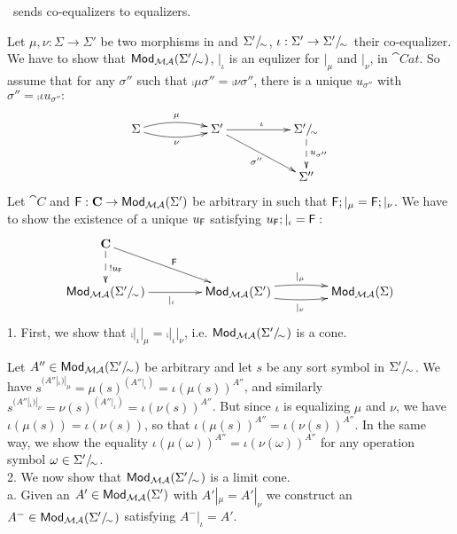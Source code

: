 \begin{lemma}\label{le:coequtoequ}
\Mod\ sends co-equalizers to equalizers.
\end{lemma}
\begin{PROOF}
Let $\mu,\nu:\Sigma \to \Sigma'$ be two morphisms in  and  $\Sigma'/\!_{\sim_{}}$,
	$\iota: \Sigma' \to \Sigma'/\!_{\sim_{}}$ their
	co-equalizer. 
We have to show that
	${\sf {Mod}}_{{\mathcal{MA}}}(\Sigma'/\!_{\sim_{}})$, $|_{\iota}$
	is an equlizer for $|_{\mu}$ and $|_{\nu}$, in $\cat{Cat}$.
So assume that for any $\sigma''$ such that
$\comp\mu{\sigma''}=\comp\nu{\sigma''}$, there is a unique $u_{\sigma''}$
with $\sigma''=\comp{\iota}{u_{\sigma''}}:$
\[\xymatrix@C=1.8cm{ %
\Sigma \ar@/_/[r]_{\nu} \ar@/^/[r]^{\mu}
	& {\Sigma'} \ar[r]^{\iota} \ar[dr]_{\sigma''}
	& \qu{\Sigma'}{\kernel{}} \ar@{-->}[d]^{u_{\sigma''}} \\
&& \Sigma''
}
\]
Let $\cat{C}$ and ${\sf {F}}:{\bf C}\to{\sf {Mod}}_{{\mathcal{MA}}}(\Sigma')$ be arbitrary
in  such that ${\sf {F}};|_\mu={\sf {F}};|_\nu$. We have to show the
existence of a unique $u_{{\sf {F}}}$ satisfying
$u_{{\sf {F}}};|_{\iota}={\sf {F}}:$
\[\xymatrix@C=1.5cm{
\label{di:modequlizer}
	\cat{C} \ar[dr]^{\fu{F}}  \ar@{-->}[d]^{!u_{\fu{F}}} \\
	\Mod_{\inst{MA}}(\qu{\Sigma'}{\kernel{}}) \ar[r]_{|_{\iota}}
		& \Mod_{\inst{MA}}(\Sigma') \ar@/_/[r]_{|_\nu} \ar@/^/[r]^{|_\mu}
			& \Mod_{\inst{MA}}(\Sigma) 	\\
							}
\]
1. First, we show that $\comp{|_\iota}{|_\mu}=\comp{|_\iota}{|_\nu}$, i.e. ${\sf {Mod}}_{{\mathcal{MA}}}(\Sigma'/\!_{\sim_{}})$ is a cone.

Let $A''\in{\sf {Mod}}_{{\mathcal{MA}}}(\Sigma'/\!_{\sim_{}})$ be arbitrary and let $s$ be any
sort symbol in $\Sigma'/\!_{\sim_{}}$. We have $s^{(A''|_{\iota})|_{\mu}}
= \mu(s)^{(A''|_{\iota})}= \iota(\mu(s))^{A''}$, and similarly $s^{(A''|_{\iota})|_{\nu}}
= \nu(s)^{(A''|_{\iota})}= \iota(\nu(s))^{A''}$. But since $\iota$ is
equalizing $\mu$ and $\nu$, we have $ \iota(\mu(s))= \iota(\nu(s))$, so that
$\iota(\mu(s))^{A''} =  \iota(\nu(s))^{A''}$. In the same way, we show the
equality $\iota(\mu(\omega))^{A''} =  \iota(\nu(\omega))^{A''}$ for any
operation symbol $\omega\in\Sigma'/\!_{\sim_{}}$. 
\\[1ex]
2. We now show that ${\sf {Mod}}_{{\mathcal{MA}}}(\Sigma'/\!_{\sim_{}})$ is a limit cone.
\\[1ex]
a. Given an $A'\in{\sf {Mod}}_{{\mathcal{MA}}}(\Sigma')$ with $A'|_\mu=A'|_\nu$ we construct an
$A^-\in{\sf {Mod}}_{{\mathcal{MA}}}(\Sigma'/\!_{\sim_{}})$ satisfying $A^-|_\iota=A'$.


\end{PROOF}
